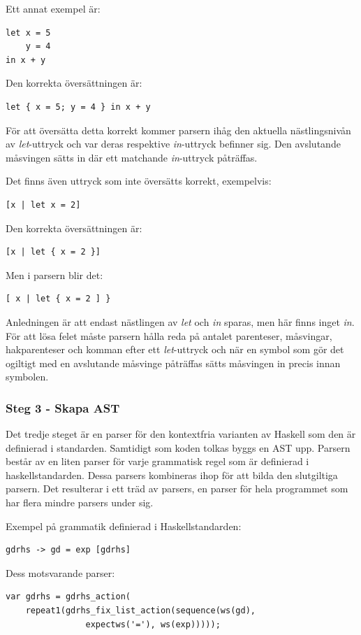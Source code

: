Ett annat exempel är:
\begin{lstlisting}
let x = 5
    y = 4
in x + y
\end{lstlisting}
Den korrekta översättningen är:
\begin{lstlisting}
let { x = 5; y = 4 } in x + y
\end{lstlisting}
För att översätta detta korrekt kommer parsern ihåg den aktuella nästlingsnivån av \emph{let}-uttryck och var deras respektive \emph{in}-uttryck befinner sig. 
Den avslutande måsvingen sätts in där ett matchande \emph{in}-uttryck påträffas.

Det finns även uttryck som inte översätts korrekt, exempelvis:
\begin{lstlisting}
[x | let x = 2]
\end{lstlisting}
Den korrekta översättningen är:
\begin{lstlisting}
[x | let { x = 2 }]
\end{lstlisting}
Men i parsern blir det:
\begin{lstlisting}
[ x | let { x = 2 ] }
\end{lstlisting}
Anledningen är att endast nästlingen av \emph{let} och \emph{in} sparas, men här finns inget \emph{in}.
För att lösa felet måste parsern hålla reda på antalet parenteser, måsvingar, hakparenteser och komman efter ett \emph{let}-uttryck och när en symbol som gör det ogiltigt 
med en avslutande måsvinge påträffas sätts måsvingen in precis innan symbolen.

\subsubsection{Steg 3 - Skapa AST}
Det tredje steget är en parser för den kontextfria varianten av Haskell som den är definierad i standarden. 
Samtidigt som koden tolkas byggs en AST upp. Parsern består av en liten parser för varje grammatisk regel som är definierad i haskellstandarden. 
Dessa parsers kombineras ihop för att bilda den slutgiltiga parsern. Det resulterar i ett träd av parsers, en parser för hela programmet som har flera mindre parsers under sig.

Exempel på grammatik definierad i Haskellstandarden:
\begin{lstlisting}
gdrhs -> gd = exp [gdrhs]
\end{lstlisting}
Dess motsvarande parser:
\begin{lstlisting}
var gdrhs = gdrhs_action(
    repeat1(gdrhs_fix_list_action(sequence(ws(gd), 
                expectws('='), ws(exp)))));
\end{lstlisting}

